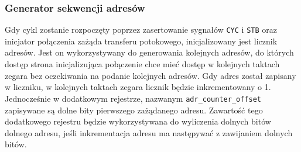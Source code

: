 \subsubsection{Generator sekwencji adresów}

Gdy cykl zostanie rozpoczęty poprzez zasertowanie sygnałów \texttt{CYC} i \texttt{STB} oraz inicjator połączenia zażąda transferu potokowego, inicjalizowany jest licznik adresów. Jest on wykorzystywany do generowania kolejnych adresów, do których dostęp strona inicjalizująca połączenie chce mieć dostęp w kolejnych taktach zegara bez oczekiwania na podanie kolejnych adresów. Gdy adres został zapisany w liczniku, w kolejnych taktach zegara licznik będzie inkrementowany o 1.
Jednocześnie w dodatkowym rejestrze, nazwanym \texttt{adr_counter_offset} zapisywane są dolne bity pierwszego zażądanego adresu. Zawartość tego dodatkowego rejestru będzie wykorzystywana do wyliczenia dolnych bitów dolnego adresu, jeśli inkrementacja adresu ma następywać z zawijaniem dolnych bitów.

